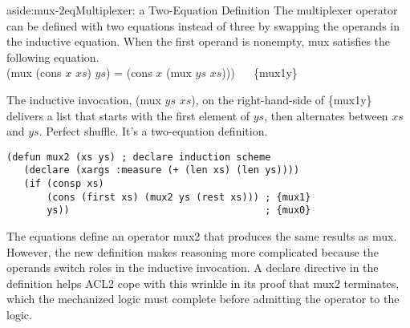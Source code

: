 \begin{aside}{aside:mux-2eq}{Multiplexer: a Two-Equation Definition}
The multiplexer operator can be defined with two equations instead of three
by swapping the operands in the inductive equation.
When the first operand is nonempty, \textsf{mux} satisfies the following equation.\\
\hspace*{1cm}\textsf{(mux (cons $x$ $xs$) $ys$) = (cons $x$ (mux $ys$ $xs$)))} ~~ \{mux1y\}

The inductive invocation, \textsf{(mux $ys$ $xs$)},
on the right-hand-side of \{mux1y\}
delivers a list that starts with the first element of $ys$,
then alternates between $xs$ and $ys$.
Perfect shuffle.
It's a two-equation definition. %

\label{mux-2eq-defun}
\begin{code}
\begin{verbatim}
(defun mux2 (xs ys) ; declare induction scheme
   (declare (xargs :measure (+ (len xs) (len ys))))
   (if (consp xs)
       (cons (first xs) (mux2 ys (rest xs))) ; {mux1}
       ys))                                  ; {mux0}
\end{verbatim}
\end{code}

The equations define an operator \textsf{mux2} that produces
the same results as \textsf{mux}.
However, the new definition makes reasoning more complicated
because the operands switch roles in the inductive invocation.
A \textsf{declare} directive in the definition
helps ACL2 cope with this wrinkle in its
proof that \textsf{mux2} terminates,
which the mechanized logic must complete before
admitting the operator to the logic.
\end{aside}

